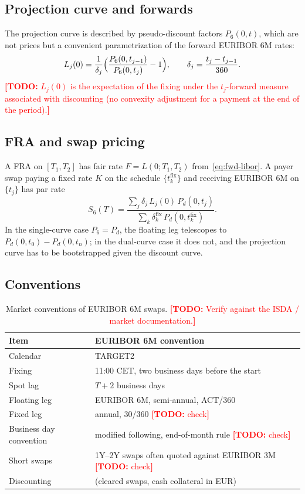 \documentclass[11pt,a4paper]{article}
\theoremstyle{plain}
\theoremstyle{definition}
\newcommand{\estr}{\text{\texteuro STR}}
\newcommand{\todo}[1]{\textcolor{red}{\textbf{[TODO:} #1\textbf{]}}}
\begin{document}
\subsection{Projection curve and forwards}
The projection curve is described by pseudo-discount factors $P_6(0,t)$, which are not prices but a convenient parametrization of the forward EURIBOR 6M rates:
\begin{equation}
    L_j(0)=\frac{1}{\delta_j}\Bigl(\frac{P_6(0,t_{j-1})}{P_6(0,t_j)}-1\Bigr),\qquad \delta_j=\frac{t_j-t_{j-1}}{360}.
    \label{eq:fwd-libor}
\end{equation}
\todo{$L_j(0)$ is the expectation of the fixing under the $t_j$-forward measure associated with \estr{} discounting (no convexity adjustment for a payment at the end of the period).}

\subsection{FRA and swap pricing}
A FRA on $[T_1,T_2]$ has fair rate $F=L(0;T_1,T_2)$ from~\eqref{eq:fwd-libor}. A payer swap paying a fixed rate $K$ on the schedule $\{t^{\mathrm{fix}}_k\}$ and receiving EURIBOR 6M on $\{t_j\}$ has par rate
\begin{equation}
    S_6(T)=\frac{\sum_j\delta_j\,L_j(0)\,P_d(0,t_j)}{\sum_k\delta^{\mathrm{fix}}_k\,P_d(0,t^{\mathrm{fix}}_k)}.
    \label{eq:par-dual}
\end{equation}
In the single-curve case $P_6=P_d$, the floating leg telescopes to $P_d(0,t_0)-P_d(0,t_n)$; in the dual-curve case it does not, and the projection curve has to be bootstrapped given the discount curve.

\subsection{Conventions}
\begin{table}[htbp]
\centering
\begin{tabular}{@{}ll@{}}
\toprule
Item & EURIBOR 6M convention \\
\midrule
Calendar & TARGET2 \\
Fixing & 11:00 CET, two business days before the start \\
Spot lag & $T+2$ business days \\
Floating leg & EURIBOR 6M, semi-annual, ACT/360 \\
Fixed leg & annual, 30/360 \todo{check} \\
Business day convention & modified following, end-of-month rule \todo{check} \\
Short swaps & 1Y--2Y swaps often quoted against EURIBOR 3M \todo{check} \\
Discounting & \estr{} (cleared swaps, cash collateral in EUR) \\
\bottomrule
\end{tabular}
\caption{Market conventions of EURIBOR 6M swaps. \todo{Verify against the ISDA / market documentation.}}
\label{tab:conventions}
\end{table}
\end{document}
